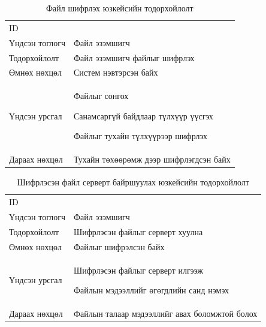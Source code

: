 \begin{table}
    \label{tab:treatments}
    \footnotesize
    \centering
    \begin{tabularx}{\textwidth}{|>{\hsize=0.3\hsize}X|>{\hsize=0.7\hsize}X|}
        \hline
        \multicolumn{2}{|c|}{Файл шифрлэх} \\
        \hline
        ID & 3 \\
        \hline
        Үндсэн тоглогч & Файл эзэмшигч\\
        \hline
        Тодорхойлолт & Файл эзэмшигч файлыг шифрлэх\\
        \hline
        Өмнөх нөхцөл & Систем нэвтэрсэн байх\\
        \hline
        Үндсэн урсгал &
            \item Файлыг сонгох
            \item Санамсаргүй байдлаар түлхүүр үүсгэх
            \item Файлыг тухайн түлхүүрээр шифрлэх
        \\
        \hline
        Дараах нөхцөл & Тухайн төхөөрөмж дээр шифрлэгдсэн байх\\
        \hline
    \end{tabularx}
    \caption{Файл шифрлэх юзкейсийн тодорхойлолт}
\end{table}

\begin{table}
    \label{tab:treatments}
    \footnotesize
    \centering
    \begin{tabularx}{\textwidth}{|>{\hsize=0.3\hsize}X|>{\hsize=0.7\hsize}X|}
        \hline
        \multicolumn{2}{|c|}{Шифрлэсэн файл серверт байршуулах} \\
        \hline
        ID & 4 \\
        \hline
        Үндсэн тоглогч & Файл эзэмшигч\\
        \hline
        Тодорхойлолт & Шифрлэсэн файлыг серверт хуулна\\
        \hline
        Өмнөх нөхцөл & Файлыг шифрэлсэн байх\\
        \hline
        Үндсэн урсгал &
            \item Шифрлэсэн файлыг серверт илгээж
            \item Файлын мэдээллийг өгөгдлийн санд нэмэх 
        \\
        \hline
        Дараах нөхцөл & Файлын талаар мэдээллийг авах боломжтой болох\\
        \hline
    \end{tabularx}
    \caption{Шифрлэсэн файл серверт байршуулах юзкейсийн тодорхойлолт}
\end{table}

